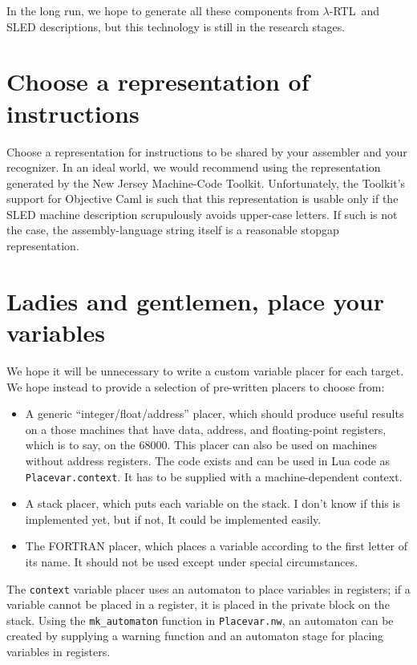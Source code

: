 \documentclass[12pt]{article}
\newcommand\lrtl{\mbox{$\lambda$-RTL}}
\begin{document}
In the long run,
we hope to generate all these components from \lrtl\ and SLED descriptions,
but this technology is still in the research stages.

\section{Choose a representation of instructions}

Choose a representation for instructions to be shared by your
assembler and your recognizer.
In an ideal world, 
we would recommend using the representation generated by the New Jersey
Machine-Code Toolkit. 
Unfortunately, the Toolkit's support for Objective Caml is such that
this representation is usable only if the SLED machine description
scrupulously avoids upper-case letters.
If such is not the case, the assembly-language string itself is a
reasonable stopgap representation.


\section{Ladies and gentlemen, place your variables} 


We hope it will be unnecessary to write a custom variable placer for
each target.
We hope instead to provide a selection of pre-written placers to
choose from:
\begin{itemize}
\item
A generic ``integer/float/address'' placer, which should produce useful
results on a those machines that have data, address, and 
floating-point registers, which is to say, on the 68000.
This placer can also be used on machines without address registers.
The code exists and can be used in Lua code as
\texttt{Placevar.context}. 
It has to be supplied with a machine-dependent context.
\item
A stack placer, which puts each variable on the stack.
I don't know if this is implemented yet, but if not, It could be
implemented easily.
\item
The FORTRAN placer, which places a variable according to the first
letter of its name.
It should not be used except under special circumstances.
\end{itemize}

The \texttt{context} variable placer uses an automaton to place variables in registers;
if a variable cannot be placed in a register, it is placed in the private block on the
stack.
Using the \verb+mk_automaton+ function in \texttt{Placevar.nw}, an
automaton can be created by 
supplying a warning function and an automaton stage for placing variables in
registers.
\end{document}
